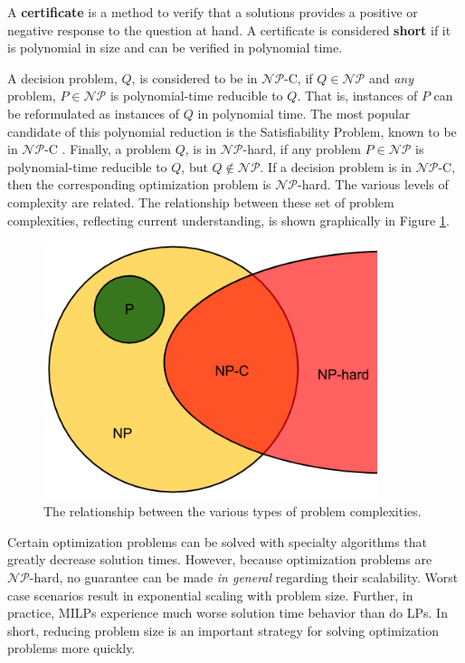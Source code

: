 \begin{define}
A \textbf{certificate} is a method to verify that a solutions provides a
positive or negative response to the question at hand. A certificate is
considered \textbf{short} if it is polynomial in size and can be verified in
polynomial time.
\end{define}

\noindent
A decision problem, $Q$, is considered to be in $\mathcal{NP}$-C, if $Q \in
\mathcal{NP}$ and \textit{any} problem, $P \in \mathcal{NP}$ is polynomial-time
reducible to $Q$. That is, instances of $P$ can be reformulated as instances of
$Q$ in polynomial time. The most popular candidate of this polynomial reduction
is the Satisfiability Problem, known to be in $\mathcal{NP}$-C
\cite{Cook:1971:CTP,levin1973universal}. Finally, a problem $Q$, is in
$\mathcal{NP}$-hard, if any problem $P \in \mathcal{NP}$ is polynomial-time
reducible to $Q$, but $Q \not\in \mathcal{NP}$. If a decision problem is in
$\mathcal{NP}$-C, then the corresponding optimization problem is
$\mathcal{NP}$-hard. The various levels of complexity are related. The
relationship between these set of problem complexities, reflecting current
understanding, is shown graphically in Figure \ref{fig:complexity}.

\begin{figure}[H]
  \begin{center}
    \includegraphics[height=7.5cm]{./chapters/1-intro/figs/complexity.png}
  \caption{The relationship between the various types of problem complexities.}
  \label{fig:complexity}
  \end{center}
\end{figure}

Certain optimization problems can be solved with specialty algorithms that
greatly decrease solution times. However, because optimization problems are
$\mathcal{NP}\text{-hard}$, no guarantee can be made \textit{in general}
regarding their scalability. Worst case scenarios result in exponential scaling
with problem size. Further, in practice, MILPs experience much worse solution
time behavior than do LPs. In short, reducing problem size is an important
strategy for solving optimization problems more quickly.
